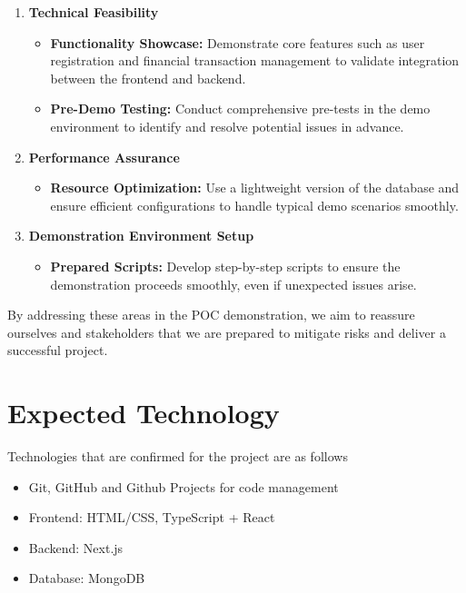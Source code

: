 \documentclass{article}
\begin{document}
\begin{enumerate}[label=\arabic*.]
    \item \textbf{Technical Feasibility}
    \begin{itemize}
        \item \textbf{Functionality Showcase:} Demonstrate core features such as user registration and financial transaction management to validate integration between the frontend and backend.
        \item \textbf{Pre-Demo Testing:} Conduct comprehensive pre-tests in the demo environment to identify and resolve potential issues in advance.
    \end{itemize}

    \item \textbf{Performance Assurance}
    \begin{itemize}
        \item \textbf{Resource Optimization:} Use a lightweight version of the database and ensure efficient configurations to handle typical demo scenarios smoothly.
    \end{itemize}

    \item \textbf{Demonstration Environment Setup}
    \begin{itemize}
        \item \textbf{Prepared Scripts:} Develop step-by-step scripts to ensure the demonstration proceeds smoothly, even if unexpected issues arise.
    \end{itemize}
\end{enumerate}

By addressing these areas in the POC demonstration, we aim to reassure ourselves and stakeholders that we are prepared to mitigate risks and deliver a successful project.


\section{Expected Technology}

Technologies that are confirmed for the project are as follows

\begin{itemize}
  \item Git, GitHub and Github Projects for code management
  \item Frontend: HTML/CSS, TypeScript + React
  \item Backend: Next.js
  \item Database: MongoDB
\end{itemize}
\end{document}
